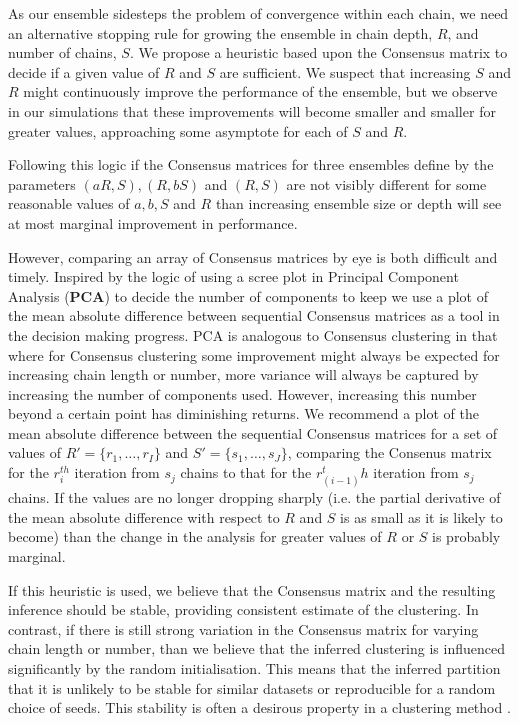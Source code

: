 \documentclass{bioinfo}
\begin{document}
As our ensemble sidesteps the problem of convergence within each chain, we need an alternative stopping rule for growing the ensemble in chain depth, $R$, and number of chains, $S$. We propose a heuristic based upon the Consensus matrix to decide if a given value of $R$ and $S$ are sufficient. We suspect that increasing $S$ and $R$ might continuously improve the performance of the ensemble, but we observe in our simulations that these improvements will become smaller and smaller for greater values, approaching some asymptote for each of $S$ and $R$. 

Following this logic if the Consensus matrices for three ensembles define by the parameters $(aR, S), (R, bS)$ and $(R, S)$ are not visibly different for some reasonable values of $a, b, S$ and $R$ than increasing ensemble size or depth will see at most marginal improvement in performance. 

However, comparing an array of Consensus matrices by eye is both difficult and timely. Inspired by the logic of using a scree plot in Principal Component Analysis (\textbf{PCA}) to decide the number of components to keep we use a plot of the mean absolute difference between sequential Consensus matrices as a tool in the decision making progress. PCA is analogous to Consensus clustering in that where for Consensus clustering some improvement might always be expected for increasing chain length or number, more variance will always be captured by increasing the number of components used. However, increasing this number beyond a certain point has diminishing returns. We recommend a plot of the mean absolute difference between the sequential Consensus matrices for a set of values of $R' = \{r_1, \ldots, r_I\}$ and $S'=\{s_1, \ldots, s_J\}$, comparing the Consenus matrix for the $r_i^{th}$ iteration from $s_j$ chains to that for the $r_{(i-1)}^th$ iteration from $s_j$ chains. If the values are no longer dropping sharply (i.e. the partial derivative of the mean absolute difference with respect to $R$ and $S$ is as small as it is likely to become) than the change in the analysis for greater values of $R$ or $S$ is probably marginal.

If this heuristic is used, we believe that the Consensus matrix and the resulting inference should be stable, providing consistent estimate of the clustering. In contrast, if there is still strong variation in the Consensus matrix for varying chain length or number, than we believe that the inferred clustering is influenced significantly by the random initialisation. This means that the inferred partition that it is unlikely to be stable for similar datasets or reproducible for a random choice of seeds. This stability is often a desirous property in a clustering method \citep{von2005towards, meinshausen2010stability}.
\end{document}
